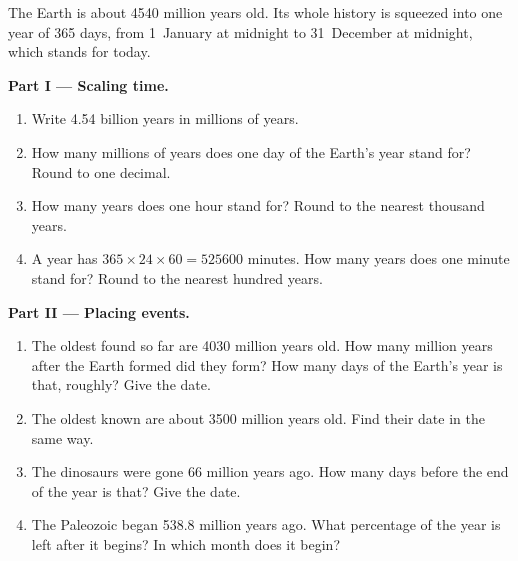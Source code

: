 \begin{problem}
\label{pb:g7:geological-time:1}
The Earth is about \num{4540} million years old. Its whole history is
squeezed into one year of 365 days, from 1~January at midnight to
31~December at midnight, which stands for today.

\medskip
\noindent\textbf{Part I --- Scaling time.}\par\nopagebreak
\begin{enumerate}[beginpenalty=10000]
  \item Write \num{4.54} billion years in millions of years.
  \item How many millions of years does one day of the Earth's year stand
        for? Round to one decimal.
  \item How many years does one hour stand for? Round to the nearest
        thousand years.
  \item A year has $365 \times 24 \times 60 = \num{525600}$ minutes. How
        many years does one minute stand for? Round to the nearest
        hundred years.
\end{enumerate}

\medskip
\noindent\textbf{Part II --- Placing events.}\par\nopagebreak
\begin{enumerate}[resume, beginpenalty=10000]
  \item The oldest  found so far are \num{4030} million years old.
        How many million years after the Earth formed did they form? How
        many days of the Earth's year is that, roughly? Give the date.
  \item The oldest known  are about \num{3500} million years old.
        Find their date in the same way.
  \item The dinosaurs were gone \num{66} million years ago. How many days
        before the end of the year is that? Give the date.
  \item The Paleozoic began \num{538.8} million years ago. What
        percentage of the year is left after it begins? In which month
        does it begin?
\end{enumerate}


\end{problem}
